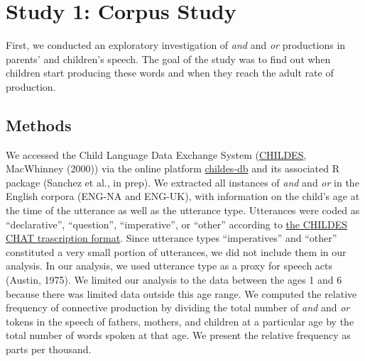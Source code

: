 \documentclass[10pt, letterpaper]{article}
\begin{document}
\section{Study 1: Corpus Study}\label{study-1-corpus-study}

First, we conducted an exploratory investigation of \emph{and} and
\emph{or} productions in parents' and children's speech. The goal of the
study was to find out when children start producing these words and when
they reach the adult rate of production.

\subsection{Methods}\label{methods}

We accessed the Child Language Data Exchange System
(\href{https://childes.talkbank.org/}{CHILDES}, MacWhinney (2000)) via
the online platform \href{http://childes-db.stanford.edu/}{childes-db}
and its associated R package (Sanchez et al., in prep). We extracted all
instances of \emph{and} and \emph{or} in the English corpora (ENG-NA and
ENG-UK), with information on the child's age at the time of the
utterance as well as the utterance type. Utterances were coded as
``declarative'', ``question'', ``imperative'', or ``other'' according to
\href{https://talkbank.org/manuals/CHAT.html\#_Toc486414422}{the CHILDES
CHAT trascription format}. Since utterance types ``imperatives'' and
``other'' constituted a very small portion of utterances, we did not
include them in our analysis. In our analysis, we used utterance type as
a proxy for speech acts (Austin, 1975). We limited our analysis to the
data between the ages 1 and 6 because there was limited data outside
this age range. We computed the relative frequency of connective
production by dividing the total number of \emph{and} and \emph{or}
tokens in the speech of fathers, mothers, and children at a particular
age by the total number of words spoken at that age. We present the
relative frequency as parts per thousand.
\end{document}
